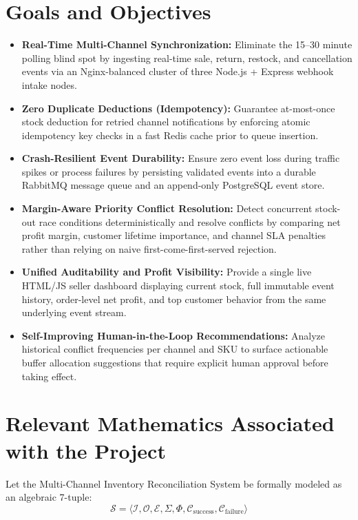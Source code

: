 \documentclass[oneside,a4paper,12pt]{report}
\begin{document}
\section{Goals and Objectives}
\begin{itemize}
  \item \textbf{Real-Time Multi-Channel Synchronization:} Eliminate the 15--30 minute polling blind spot by ingesting real-time sale, return, restock, and cancellation events via an Nginx-balanced cluster of three Node.js + Express webhook intake nodes.
  \item \textbf{Zero Duplicate Deductions (Idempotency):} Guarantee at-most-once stock deduction for retried channel notifications by enforcing atomic idempotency key checks in a fast Redis cache prior to queue insertion.
  \item \textbf{Crash-Resilient Event Durability:} Ensure zero event loss during traffic spikes or process failures by persisting validated events into a durable RabbitMQ message queue and an append-only PostgreSQL event store.
  \item \textbf{Margin-Aware Priority Conflict Resolution:} Detect concurrent stock-out race conditions deterministically and resolve conflicts by comparing net profit margin, customer lifetime importance, and channel SLA penalties rather than relying on naive first-come-first-served rejection.
  \item \textbf{Unified Auditability and Profit Visibility:} Provide a single live HTML/JS seller dashboard displaying current stock, full immutable event history, order-level net profit, and top customer behavior from the same underlying event stream.
  \item \textbf{Self-Improving Human-in-the-Loop Recommendations:} Analyze historical conflict frequencies per channel and SKU to surface actionable buffer allocation suggestions that require explicit human approval before taking effect.
\end{itemize}

\section{Relevant Mathematics Associated with the Project}
\label{sec:math}
Let the Multi-Channel Inventory Reconciliation System be formally modeled as an algebraic 7-tuple:
\begin{equation}
\mathcal{S} = \langle \mathcal{I}, \mathcal{O}, \mathcal{E}, \Sigma, \Phi, \mathcal{C}_{\text{success}}, \mathcal{C}_{\text{failure}} \rangle
\end{equation}
\end{document}
